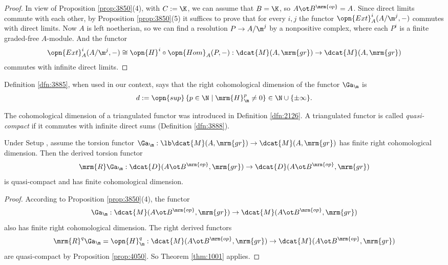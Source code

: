 \begin{proof}
In view of Proposition \ref{prop:3850}(4), with $C := \K$, we can assume that 
$B = \K$, so $A \ot B^{\mrm{op}} = A$. 
Since direct limits commute with each other, by Proposition \ref{prop:3850}(5) 
it suffices to prove that for every $i, j$ the functor 
$\opn{Ext}^i_A( A / \m^{j}, -)$
commutes with direct limits. Now $A$ is left noetherian, so we can find a 
resolution $P \to A / \m^{j}$ by a nonpositive complex, where each $P^i$ is a 
finite graded-free $A$-module. And the functor 
\[ \opn{Ext}^i_A( A / \m^{j}, -) \cong 
\opn{H}^i \circ  \opn{Hom}_A( P, -) : \dcat{M}(A, \mrm{gr}) \to
\dcat{M}(A, \mrm{gr}) \]
commutes with infinite direct limits. 
\end{proof}

Definition \ref{dfn:3885}, when used in our context, says that 
the right cohomological dimension of the functor $\Ga_{\m}$ is 
\begin{equation} \label{eqn:3962}
d := \opn{sup} \, \{ p \in \N \mid \mrm{H}^p_{\m} \neq 0 \} \in 
\N \cup \{ \pm \infty \} .
\end{equation}

The cohomological dimension of a triangulated functor was introduced in 
Definition \ref{dfn:2126}. A triangulated functor is called 
{\em quasi-compact} if it commutes with infinite direct sums (Definition 
\ref{dfn:3888}). 

\begin{thm} \label{thm:4050}  
Under Setup \tup{\ref{setup:3755}}, assume the torsion functor
$\Ga_{\m} : \lb \dcat{M}(A, \mrm{gr}) \to \dcat{M}(A, \mrm{gr})$ 
has finite right cohomological dimension. Then the derived torsion functor 
\[ \mrm{R} \Ga_{\m} : \dcat{D}(A \ot B^{\mrm{op}}, \mrm{gr}) \to 
\dcat{D}(A \ot B^{\mrm{op}}, \mrm{gr}) \]
is quasi-compact and has finite cohomological dimension. 
\end{thm}

\begin{proof}
According to Proposition \ref{prop:3850}(4), the functor 
\[ \Ga_{\m} : \dcat{M}(A \ot B^{\mrm{op}}, \mrm{gr}) \to 
\dcat{M}(A \ot B^{\mrm{op}}, \mrm{gr}) \]
also has finite right cohomological dimension.
The right derived functors
\[ \mrm{R}^q \Ga_{\m} = \opn{H}^q_{\m} : 
\dcat{M}(A \ot B^{\mrm{op}}, \mrm{gr}) \to 
\dcat{M}(A \ot B^{\mrm{op}}, \mrm{gr}) \]
are quasi-compact by Proposition \ref{prop:4050}. So Theorem \ref{thm:1001} 
applies. 
\end{proof}

